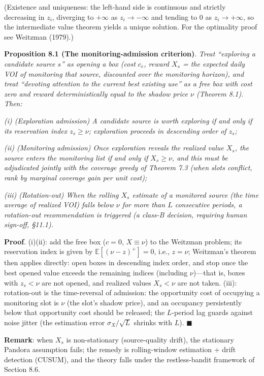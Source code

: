 \documentclass[
  11pt]{article}
\begin{document}
(Existence and uniqueness: the left-hand side is continuous and strictly
decreasing in \(z_i\), diverging to \(+\infty\) as \(z_i \to -\infty\)
and tending to 0 as \(z_i \to +\infty\), so the intermediate value
theorem yields a unique solution. For the optimality proof see Weitzman
(1979).)

\textbf{Proposition 8.1 (The monitoring-admission criterion)}.
\emph{Treat ``exploring a candidate source \(s\)'' as opening a box
(cost \(c_e\), reward \(X_s\) = the expected daily VOI of monitoring
that source, discounted over the monitoring horizon), and treat
``devoting attention to the current best existing use'' as a free box
with cost zero and reward deterministically equal to the shadow price
\(\nu\) (Theorem 8.1). Then:}

\emph{(i) (Exploration admission) A candidate source is worth exploring
if and only if its reservation index \(z_s \ge \nu\); exploration
proceeds in descending order of \(z_s\);}

\emph{(ii) (Monitoring admission) Once exploration reveals the realized
value \(X_s\), the source enters the monitoring list if and only if
\(X_s \ge \nu\), and this must be adjudicated jointly with the coverage
greedy of Theorem 7.3 (when slots conflict, rank by marginal coverage
gain per unit cost);}

\emph{(iii) (Rotation-out) When the rolling \(X_s\) estimate of a
monitored source (the time average of realized VOI) falls below \(\nu\)
for more than \(L\) consecutive periods, a rotation-out recommendation
is triggered (a class-B decision, requiring human sign-off, §11.1).}

\textbf{Proof}. (i)(ii): add the free box (\(c = 0\), \(X \equiv \nu\))
to the Weitzman problem; its reservation index is given by
\(\mathbb{E}[(\nu - z)^+] = 0\), i.e., \(z = \nu\); Weitzman's theorem
then applies directly: open boxes in descending index order, and stop
once the best opened value exceeds the remaining indices (including
\(\nu\))---that is, boxes with \(z_s < \nu\) are not opened, and
realized values \(X_s < \nu\) are not taken. (iii): rotation-out is the
time-reversal of admission: the opportunity cost of occupying a
monitoring slot is \(\nu\) (the slot's shadow price), and an occupancy
persistently below that opportunity cost should be released; the
\(L\)-period lag guards against noise jitter (the estimation error
\(\sigma_X / \sqrt{L}\) shrinks with \(L\)). \(\blacksquare\)

\textbf{Remark}: when \(X_s\) is non-stationary (source-quality drift),
the stationary Pandora assumption fails; the remedy is rolling-window
estimation + drift detection (CUSUM), and the theory falls under the
restless-bandit framework of Section 8.6.
\end{document}
